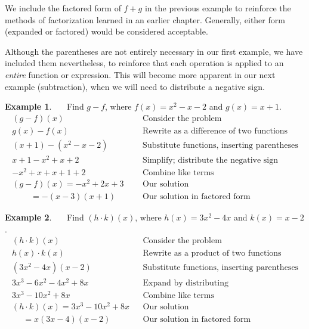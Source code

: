 \documentclass[12pt]{book}
\theoremstyle{definition}
\newtheorem{example}{Example}
\begin{document}
We include the factored form of $f+g$ in the previous example to reinforce the methods of factorization learned in an earlier chapter.  Generally, either form (expanded or factored) would be considered acceptable.\par
Although the parentheses are not entirely necessary in our first example, we have included them nevertheless, to reinforce that each operation is applied to an {\it entire} function or expression.  This will become more apparent in our next example (subtraction), when we will need to distribute a negative sign.
\begin{example}~~~Find $g-f$, where $f(x) = x^2 - x - 2$ and $g(x) = x + 1$.
  \begin{eqnarray*}
    (g - f)(x)~~~~~~~~~~ &  & \text{Consider the problem} \\
		g(x) - f(x)~~~~~~~~~ &  & \text{Rewrite~as~a~difference~of~two~functions}\\
		(x + 1)-(x^2 - x - 2)  &  & \text{Substitute~functions,~inserting~parentheses}\\
		x + 1 -x^2 + x + 2~~   &  & \text{Simplify;~distribute~the~negative~sign}\\
		-x^2 + x + x +1 + 2~~ &  & \text{Combine like terms}\\
(g - f)(x)=-x^2 +2x +3~~~ &  & \text{Our solution}\\
    ~~~~~~~~~~=-(x-3)(x+1)&  & \text{Our solution in factored form}
 \end{eqnarray*}
\end{example}
\begin{example}~~~Find $(h \cdot k)(x)$, where $h(x) = 3x^2 - 4x$ and $k(x) = x - 2$.
 \begin{eqnarray*}
    (h \cdot k)(x)~~~~~~~~~~ &  & \text{Consider the problem} \\
		h(x)\cdot k(x)~~~~~~~~~ &  & \text{Rewrite~as~a~product~of~two~functions}\\
    (3x^2 - 4x)(x - 2)~~  &  & \text{Substitute~functions,~inserting~parentheses}\\
		3x^3  -6x^2 -4x^2 +8x &  & \text{Expand~by~distributing}\\
		3x^3  -10x^2 + 8x~~~ &  & \text{Combine like terms}\\
    (h \cdot k)(x)=3x^3  -10x^2 + 8x &  & \text{Our solution}\\
    ~~~~~~=x(3x-4)(x-2)&  & \text{Our solution in factored form}
\end{eqnarray*}
\end{example}
\end{document}
